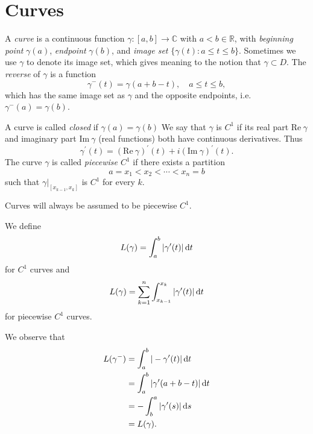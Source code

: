\section{Curves}

\begin{defn}[Curves]
  A \emph{curve} is a continuous function
  $\gamma : [a, b] \to \mathbb{C}$ with $a < b \in \mathbb{R}$,
  with \emph{beginning point} $\gamma(a)$, \emph{endpoint} $\gamma(b)$, and
  \emph{image set} $\{ \gamma(t) : a \leq t \leq b \}$. Sometimes we use
  $\gamma$ to denote its image set, which gives meaning to the notion that
  $\gamma \subset D$. The \emph{reverse} of $\gamma$ is a function
  $$
  \gamma^{-}(t) = \gamma(a + b - t), \quad a \leq t \leq b,
  $$
  which has the same image set as $\gamma$ and the opposite endpoints,
  i.e. $\gamma^{-}(a) = \gamma(b)$.

  A curve is called \emph{closed} if $\gamma(a) = \gamma(b)$ We say that
  $\gamma$ is $C^1$ if its real part $\mathrm{Re}~\gamma$ and imaginary part
  $\mathrm{Im}~\gamma$ (real functions) both have continuous derivatives.
  Thus
  $$
  \gamma^\prime(t) = (\mathrm{Re}~\gamma)^\prime(t)
                  + i (\mathrm{Im}~\gamma)^\prime(t).
  $$
  The curve $\gamma$ is called \emph{piecewise $C^1$} if
  there exists a partition
  $$
  a = x_1 < x_2 < \cdots < x_n = b
  $$
  such that $\left.\gamma\right|_{[x_{k-1}, x_k]}$ is $C^1$
  for every $k$.
\end{defn}

Curves will always be assumed to be piecewise $C^1$.

\begin{defn}
  We define
  $$
  L(\gamma) = \int_a^b |\gamma^\prime(t)| \mathop{}\!\mathrm{d} t
  $$
  for $C^1$ curves and
  $$
  L(\gamma) = \sum_{k=1}^n \int_{x_{k-1}}^{x_k} |\gamma^\prime(t)| \mathop{}\!\mathrm{d} t
  $$
  for piecewise $C^1$ curves.
\end{defn}

We observe that
\begin{align*}
   L(\gamma^{-})
&= \int_a^b |-\gamma^\prime(t)| \mathop{}\!\mathrm{d} t \\
&= \int_a^b |\gamma^\prime(a + b - t)| \mathop{}\!\mathrm{d} t \\
&= -\int_b^a |\gamma^{\prime}(s)| \mathop{}\!\mathrm{d} s \\
&= L(\gamma).
\end{align*}

